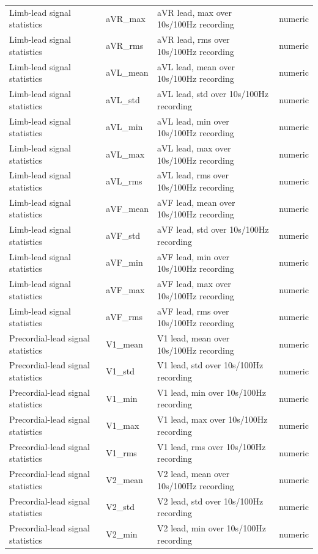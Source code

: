 \begin{table}[htbp]
\begin{tabular}{llll}
Limb-lead signal statistics & aVR\_max & aVR lead, max over 10s/100Hz recording & numeric \\
Limb-lead signal statistics & aVR\_rms & aVR lead, rms over 10s/100Hz recording & numeric \\
Limb-lead signal statistics & aVL\_mean & aVL lead, mean over 10s/100Hz recording & numeric \\
Limb-lead signal statistics & aVL\_std & aVL lead, std over 10s/100Hz recording & numeric \\
Limb-lead signal statistics & aVL\_min & aVL lead, min over 10s/100Hz recording & numeric \\
Limb-lead signal statistics & aVL\_max & aVL lead, max over 10s/100Hz recording & numeric \\
Limb-lead signal statistics & aVL\_rms & aVL lead, rms over 10s/100Hz recording & numeric \\
Limb-lead signal statistics & aVF\_mean & aVF lead, mean over 10s/100Hz recording & numeric \\
Limb-lead signal statistics & aVF\_std & aVF lead, std over 10s/100Hz recording & numeric \\
Limb-lead signal statistics & aVF\_min & aVF lead, min over 10s/100Hz recording & numeric \\
Limb-lead signal statistics & aVF\_max & aVF lead, max over 10s/100Hz recording & numeric \\
Limb-lead signal statistics & aVF\_rms & aVF lead, rms over 10s/100Hz recording & numeric \\
Precordial-lead signal statistics & V1\_mean & V1 lead, mean over 10s/100Hz recording & numeric \\
Precordial-lead signal statistics & V1\_std & V1 lead, std over 10s/100Hz recording & numeric \\
Precordial-lead signal statistics & V1\_min & V1 lead, min over 10s/100Hz recording & numeric \\
Precordial-lead signal statistics & V1\_max & V1 lead, max over 10s/100Hz recording & numeric \\
Precordial-lead signal statistics & V1\_rms & V1 lead, rms over 10s/100Hz recording & numeric \\
Precordial-lead signal statistics & V2\_mean & V2 lead, mean over 10s/100Hz recording & numeric \\
Precordial-lead signal statistics & V2\_std & V2 lead, std over 10s/100Hz recording & numeric \\
Precordial-lead signal statistics & V2\_min & V2 lead, min over 10s/100Hz recording & numeric \\

\end{tabular}
\end{table}
